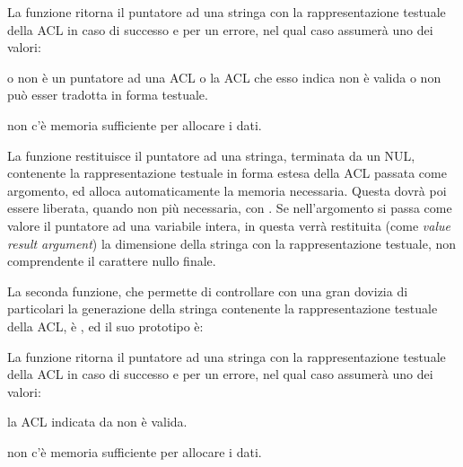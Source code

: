 \begin{funcproto}{
}

{La funzione ritorna il puntatore ad una stringa con la rappresentazione
  testuale della ACL in caso di successo e  per un errore, nel qual
  caso  assumerà uno dei valori:
  \begin{errlist}
  \item[\errcode{EINVAL}] o  non è un puntatore ad una ACL o la ACL
    che esso indica non è valida o non può esser tradotta in forma testuale.
  \item[\errcode{ENOMEM}] non c'è memoria sufficiente per allocare i dati.
  \end{errlist}
}  
\end{funcproto}

La funzione restituisce il puntatore ad una stringa, terminata da un NUL,
contenente la rappresentazione testuale in forma estesa della ACL passata come
argomento, ed alloca automaticamente la memoria necessaria. Questa dovrà poi
essere liberata, quando non più necessaria, con .  Se
nell'argomento  si passa come valore il puntatore ad una
variabile intera, in questa verrà restituita (come \textit{value result
  argument}) la dimensione della stringa con la rappresentazione testuale, non
comprendente il carattere nullo finale.

La seconda funzione, che permette di controllare con una gran dovizia di
particolari la generazione della stringa contenente la rappresentazione
testuale della ACL, è , ed il suo prototipo è:

\begin{funcproto}{
}

{La funzione ritorna il puntatore ad una stringa con la rappresentazione
  testuale della ACL in caso di successo e  per un errore, nel qual
  caso  assumerà uno dei valori:
  \begin{errlist}
  \item[\errcode{EINVAL}] la ACL indicata da  non è valida.
  \item[\errcode{ENOMEM}] non c'è memoria sufficiente per allocare i dati.
  \end{errlist}
}  
\end{funcproto}

